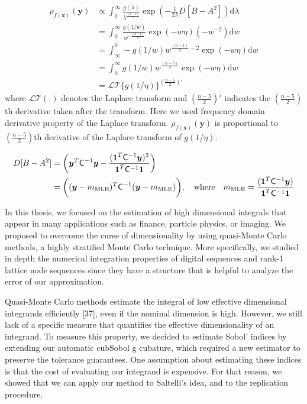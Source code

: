 \documentclass{iitthesis}          %
\newcommand{\bm}[1]{\boldsymbol{#1}}
\newcommand{\dif}[1]{\text{d}{#1}}
\newcommand{\vx}{\bm{x}}
\newcommand{\vy}{\bm{y}}
\newcommand{\vone}{\bm{1}}
\newcommand{\mCInv}{{\mathsf{C}^{-1}}}
\newcommand{\MLE}{\textup{MLE}}
\begin{document}
{{{{{{\begin{align*}
\rho_{f(\vx)}(\vy) 
& \propto \int_{0}^\infty \frac{g(\lambda)}{\lambda^{\frac{(n-1)}{2}}}
\exp \left(  - \frac{1}{2\lambda} D [B - A^2] \right)
\dif{\lambda} 
\\
&= \int_{0}^\infty \frac{g(1/w)  }{w^{-\frac{(n-1)}{2}}}
\exp \left(  - w \eta \right)
(-w^{-2})\dif{w}
\\
&= \int_\infty^0 -g(1/w) w^{\frac{(n-1)}{2} - 2}
\exp \left(  - w \eta \right)
\dif{w}
\\
&= \int_{0}^\infty g(1/w) w^{\frac{(n-5)}{2}}
\exp \left(  - w \eta \right)
\dif{w}
\\
& = \mathcal{LT}\{ g(1/\eta) \}^{(\frac{n-5}{2})'}
\end{align*}
where $\mathcal{LT}(.)$ denotes the Laplace transform and $(\frac{n-5}2)'$ indicates the $(\frac{n-5}2)$th derivative taken after the transform.
Here we used frequency domain derivative property of the Laplace transform. 
$\rho_{f(\vx)}(\vy)$  is proportional to $(\frac{n-5}2)$th derivative of the Laplace transform of $g(1/\eta)$.

\begin{align*}
D [B - A^2] &= \left(\vy^T\mCInv\vy - \frac{(\vone^T\mCInv\vy)^2}{\vone^T\mCInv\vone} \right)
\\
&= \biggl((\vy-m_\MLE)^T \mCInv (\vy-m_\MLE) \biggr), 
\quad \text{where} \quad
m_\MLE=\frac{(\vone^T \mCInv \vy)}{\vone^T\mCInv\vone}
\end{align*}
\fi










\iffalse
In this thesis, we focused on the estimation of high dimensional integrals that
appear in many applications such as finance, particle physics, or imaging. We proposed
to overcome the curse of dimensionality by using quasi-Monte Carlo methods,
a highly stratified Monte Carlo technique. More specifically, we studied in depth the
numerical integration properties of digital sequences and rank-1 lattice node sequences
since they have a structure that is helpful to analyze the error of our approximation.

Quasi-Monte Carlo methods estimate the integral of low effective dimensional
integrands efficiently [37], even if the nominal dimension is high. However, we still
lack of a specific measure that quantifies the effective dimensionality of an integrand.
To measure this property, we decided to estimate Sobol’ indices by extending our
automatic cubSobol g cubature, which required a new estimator to preserve the
tolerance guarantees. One assumption about estimating these indices is that the cost
of evaluating our integrand is expensive. For that reason, we showed that we can
apply our method to Saltelli’s idea, and to the replication procedure.

}}}}}}
\end{document}
